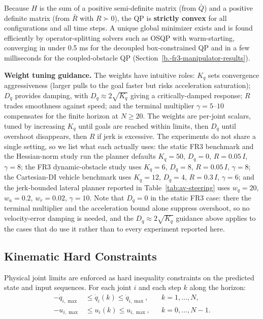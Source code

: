 Because \(H\) is the sum of a positive semi-definite matrix (from
\(\bar{Q}\)) and a positive definite matrix (from \(\bar{R}\) with
\(R \succ 0\)), the QP is \textbf{strictly convex} for all
configurations and all time steps. A unique global minimizer exists and
is found efficiently by operator-splitting solvers such as OSQP \cite{osqp}
with warm-starting, converging in under 0.5 ms for the decoupled
box-constrained QP and in a few milliseconds for the coupled-obstacle QP
(Section~\ref{b.-fr3-manipulator-results}).

\textbf{Weight tuning guidance.} The weights have intuitive roles:
\(K_q\) sets convergence aggressiveness (larger pulls to the goal faster
but risks acceleration saturation); \(D_q\) provides damping, with
\(D_q \approx 2\sqrt{K_q}\) giving a critically-damped response; \(R\)
trades smoothness against speed; and the terminal multiplier
\(\gamma = 5\)--\(10\) compensates for the finite horizon at
\(N \geq 20\). The weights are per-joint scalars, tuned by increasing
\(K_q\) until goals are reached within limits, then \(D_q\) until overshoot
disappears, then \(R\) if jerk is excessive. The experiments do not share a
single setting, so we list what each actually uses: the static FR3 benchmark
and the Hessian-norm study run the planner defaults \(K_q=50\), \(D_q=0\),
\(R=0.05\,I\), \(\gamma=8\); the FR3 dynamic-obstacle study uses
\(K_q=6\), \(D_q=8\), \(R=0.05\,I\), \(\gamma=8\); the Cartesian-DI vehicle
benchmark uses \(K_q=12\), \(D_q=4\), \(R=0.3\,I\), \(\gamma=6\); and the
jerk-bounded lateral planner reported in Table~\ref{tab:av-steering} uses
\(w_q=20\), \(w_a=0.2\), \(w_r=0.02\), \(\gamma=10\). Note that
\(D_q=0\) in the static FR3 case: there the terminal multiplier and the
acceleration bound alone suppress overshoot, so no velocity-error damping is
needed, and the \(D_q\approx2\sqrt{K_q}\) guidance above applies to the
cases that do use it rather than to every experiment reported here.

\subsection{Kinematic Hard
Constraints}\label{c.-kinematic-hard-constraints}

Physical joint limits are enforced as hard inequality constraints on the
predicted state and input sequences. For each joint \(i\) and each step
\(k\) along the horizon:
\begin{align}
\label{eq:kinematic-bounds}
-\dot{q}_{i,\max} &\leq \dot{q}_{i}(k) \leq \dot{q}_{i,\max},
&& k=1,\dots,N, \nonumber\\
-u_{i,\max} &\leq u_i(k) \leq u_{i,\max},
&& k=0,\dots,N-1 .
\end{align}

